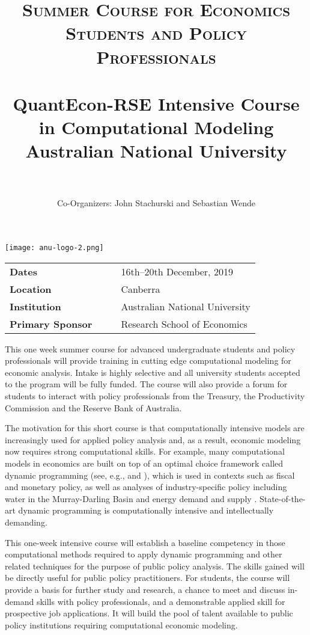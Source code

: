 \documentclass[12pt]{article}
\title{
		\usefont{OT1}{bch}{b}{n}
		\normalfont \normalsize \textsc{Summer Course for Economics Students and Policy Professionals} \\ [25pt]
		\horrule{1pt} \\[0.4cm]
		\huge QuantEcon-RSE Intensive Course in Computational Modeling \\
        \vspace{1em}
		\large Australian National University\\
		\horrule{1pt} \\[0.5cm]
}
\author{
		\normalfont \normalsize
        Co-Organizers: John Stachurski and Sebastian Wende \\[-3pt]		\normalsize
}
\date{}
\numberwithin{equation}{section}		%
\numberwithin{table}{section}				%
\begin{document}
\maketitle




\begin{center}
    \vspace{-2em}
    \texttt{[image: anu-logo-2.png]}
    \vspace{1em}

    \begin{tabular}{ l  r r l}
        \textbf{Dates} & & &  16th--20th December, 2019\\
        \textbf{Location} & & &  Canberra \\
        \textbf{Institution} & & &  Australian National University \\
        \textbf{Primary Sponsor} & & &  Research School of Economics\\
    \end{tabular}
\end{center}

\bigskip
\bigskip

\noindent 
This one week summer course for advanced undergraduate students and policy
professionals will provide training in cutting edge computational modeling for
economic analysis.  Intake is highly selective and all university students
accepted to the program will be fully funded.  The course will also provide a
forum for students to interact with policy professionals from the Treasury,
the Productivity Commission and the Reserve Bank of Australia.

The motivation for this short course is that computationally intensive models
are increasingly used for applied policy analysis and, as a result, economic
modeling now requires strong computational skills.  For example, many
computational models in economics are built on top of an optimal choice
framework called dynamic programming (see, e.g., \citet{LS18} and \citet{SLP89}), which is used in contexts such as fiscal
and monetary policy, as well as analyses of industry-specific policy including
water in the Murray-Darling Basin \citep{Grafton2011} and energy demand and
supply \citep{Ringkjob2018}.  State-of-the-art dynamic programming is
computationally intensive and intellectually demanding.

This one-week intensive course will establish a baseline competency in
those computational methods required to apply dynamic programming and other
related techniques for the purpose of public
policy analysis. The skills gained will be
directly useful for public policy practitioners. For students, the course will
provide a basis for further study and research, a chance to meet and discuss
in-demand skills with policy professionals, and a demonstrable
applied skill for prospective job applications. It will build the
pool of talent available to public policy institutions requiring computational
economic modeling.
\end{document}
